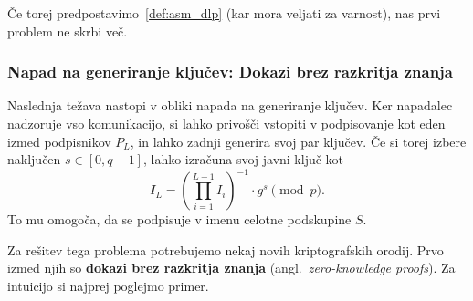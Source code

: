 \documentclass[isrm2, tisk]{fmfdelo}
\begin{document}
Če torej predpostavimo~\ref{def:asm_dlp} (kar mora veljati za varnost), nas prvi problem ne skrbi več. 

\subsubsection{Napad na generiranje ključev: Dokazi brez razkritja znanja}
Naslednja težava nastopi v obliki napada na generiranje ključev. Ker napadalec nadzoruje vso komunikacijo, 
si lahko privošči vstopiti v podpisovanje kot eden izmed podpisnikov $P_L$, in lahko zadnji generira svoj
par ključev. Če si torej izbere naključen $s \in [0, q- 1]$, lahko izračuna svoj javni ključ kot 
$$ 
I_L = \left( \prod_{i=1}^{L-1} I_i \right)^{-1} \cdot g^s \pmod p.
$$
To mu omogoča, da se podpisuje v imenu celotne podskupine $S$.

Za rešitev tega problema potrebujemo nekaj novih kriptografskih orodij. Prvo izmed njih so 
\textbf{dokazi brez razkritja znanja} (angl.\ \textit{zero-knowledge proofs}). Za intuicijo si najprej 
poglejmo primer. 
\end{document}
